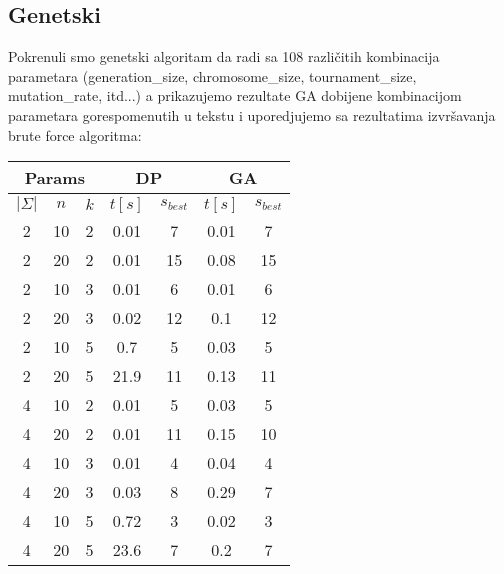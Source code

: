\documentclass{article}
\begin{document}
    \subsection{Genetski}
    Pokrenuli smo genetski algoritam da radi sa 108 različitih kombinacija parametara (generation\_size, chromosome\_size, tournament\_size, mutation\_rate, itd...) a prikazujemo rezultate GA dobijene kombinacijom parametara gorespomenutih u tekstu i uporedjujemo sa rezultatima izvršavanja brute force algoritma:

    \begin{center}
        \begin{tabular}{| c c c | c c | c c |}
            \hline
            \multicolumn{3}{|c}{Params} & \multicolumn{2}{|c}{DP} & \multicolumn{2}{|c|}{GA} \\
            \hline
            $|\Sigma|$ & $n$ & $k$ & $t[s]$ & $s_{best}$ & $t[s]$ & $s_{best}$ \\
            \hline
            2          & 10  & 2   & 0.01   & 7          & 0.01   & 7          \\
            \hline
            2          & 20  & 2   & 0.01   & 15         & 0.08   & 15         \\
            \hline
            2          & 10  & 3   & 0.01   & 6          & 0.01   & 6          \\
            \hline
            2          & 20  & 3   & 0.02   & 12         & 0.1    & 12         \\
            \hline
            2          & 10  & 5   & 0.7    & 5          & 0.03   & 5          \\
            \hline
            2          & 20  & 5   & 21.9   & 11         & 0.13   & 11         \\
            \hline
            4          & 10  & 2   & 0.01   & 5          & 0.03   & 5          \\
            \hline
            4          & 20  & 2   & 0.01   & 11         & 0.15   & 10         \\
            \hline
            4          & 10  & 3   & 0.01   & 4          & 0.04   & 4          \\
            \hline
            4          & 20  & 3   & 0.03   & 8          & 0.29   & 7          \\
            \hline
            4          & 10  & 5   & 0.72   & 3          & 0.02   & 3          \\
            \hline
            4          & 20  & 5   & 23.6   & 7          & 0.2    & 7          \\

\end{tabular}
\end{center}
\end{document}
